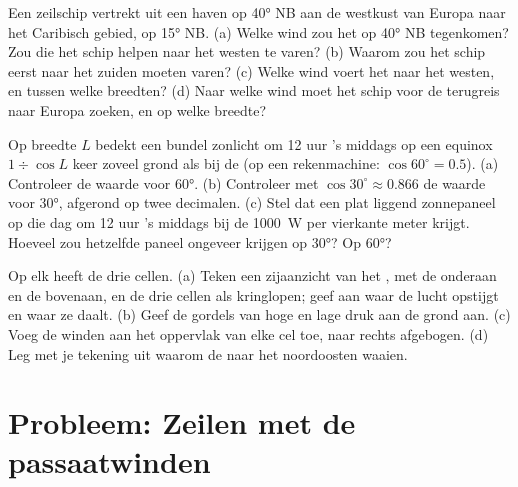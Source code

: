 \begin{exercise}[$\star\star$]\label{exo:g8:winds-global-circulation:10}
Een zeilschip vertrekt uit een haven op \ang{40} NB aan de westkust van
Europa naar het Caribisch gebied, op \ang{15} NB. (a) Welke wind zou het op
\ang{40} NB tegenkomen? Zou die het schip helpen naar het westen te varen?
(b) Waarom zou het schip eerst naar het zuiden moeten varen? (c) Welke wind
voert het naar het westen, en tussen welke breedten? (d) Naar welke wind
moet het schip voor de terugreis naar Europa zoeken, en op welke breedte?
\end{exercise}

\begin{exercise}[$\star\star\star$]\label{exo:g8:winds-global-circulation:11}
Op breedte $L$ bedekt een bundel zonlicht om 12 uur 's middags op een
equinox $1 \div
\cos L$ keer zoveel grond als bij de  (op een rekenmachine:
$\cos 60^\circ = 0.5$). (a) Controleer de waarde voor \ang{60}. (b) Controleer
met $\cos 30^\circ \approx 0.866$ de waarde voor \ang{30}, afgerond op twee
decimalen. (c) Stel dat een plat liggend zonnepaneel op die dag om 12 uur
's middags bij de  \qty{1000}{W} per vierkante meter krijgt. Hoeveel
zou hetzelfde paneel ongeveer krijgen op \ang{30}? Op \ang{60}?
\end{exercise}

\begin{exercise}[$\star\star\star$]\label{exo:g8:winds-global-circulation:12}
Op elk  heeft de  drie cellen. (a) Teken een
zijaanzicht van het , met de  onderaan en de 
bovenaan, en de drie cellen als kringlopen; geef aan waar de lucht opstijgt
en waar ze daalt. (b) Geef de gordels van hoge en lage druk aan de grond
aan. (c) Voeg de winden aan het oppervlak van elke cel toe, naar rechts
afgebogen. (d) Leg met je tekening uit waarom de  naar het
noordoosten waaien.
\end{exercise}

\section{Probleem: Zeilen met de passaatwinden}

